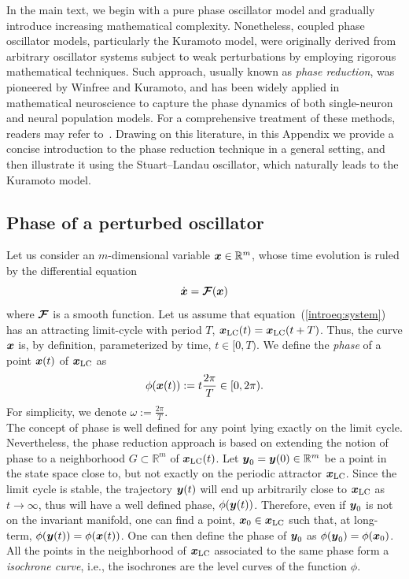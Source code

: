 In the main text, we begin with a pure phase oscillator model and gradually introduce increasing mathematical complexity.
Nonetheless, coupled phase oscillator models, particularly the Kuramoto model, were originally derived from arbitrary oscillator 
systems subject to weak perturbations by employing rigorous mathematical techniques.
Such approach, usually known as \emph{phase reduction}, was pioneered by Winfree and Kuramoto,
 and has been widely applied in mathematical neuroscience to capture the phase dynamics of both single-neuron and neural population models. For a comprehensive treatment of these methods, readers may refer to~\cite{Winfree2001,Kuramoto1984,hoppensteadt1997,Pikovsky2003}.
 Drawing on this literature, in this Appendix we provide a concise introduction to the phase reduction technique in a general setting, and then illustrate it using the Stuart–Landau oscillator, which naturally leads to the Kuramoto model.

\subsection{Phase of a perturbed oscillator}
\label{app:phase_of_perturbed_oscillator}
Let us consider an $m$-dimensional variable $\boldsymbol{x}\in\mathbb{R}^m$, whose time evolution is ruled by the differential equation
\begin{equation}\label{introeq:system}
\dot{\boldsymbol{x}}=\boldsymbol{\mathcal {F}}(\boldsymbol{x})
\end{equation}
where $\boldsymbol{\mathcal{F}}$ is a smooth function. Let us assume that equation~(\ref{introeq:system})
has an attracting limit-cycle with period $T$, $\boldsymbol{x}_{\text{LC}}(t)=\boldsymbol{x}_{\text{LC}}(t+T)$.
Thus, the curve $\boldsymbol{x}$ is, by definition, parameterized by time, $t\in[0,T)$.
We define the \emph{phase} of a point $\boldsymbol{x}(t)$ of $\boldsymbol{x}_{\text{LC}}$ as
\begin{equation}
\phi(\boldsymbol{x}(t)):=t\frac{2\pi}{T}\in[0,2\pi).
\end{equation}
For simplicity, we denote $\omega:=\frac{2\pi}{T}$.\\

The concept of phase is well defined for any point lying exactly on the limit cycle.
Nevertheless, the phase reduction approach is based on extending the notion of phase to a neighborhood $G\subset \mathbb{R}^m$ of $\boldsymbol{x}_{\text{LC}}(t)$.
Let $\boldsymbol{y}_0=\boldsymbol{y}(0)\in\mathbb{R}^m$ be a point in the state space close to, but not exactly on the periodic attractor $\boldsymbol{x}_{\text{LC}}$.
Since the limit cycle is stable, the trajectory $\boldsymbol{y}(t)$ will end up arbitrarily close to $\boldsymbol{x}_{\text{LC}}$ as $t\to\infty$,
thus will have a well defined phase, $\phi(\boldsymbol{y}(t))$.
Therefore, even if $\boldsymbol{y}_0$ is not on the invariant manifold,
one can find a point, $\boldsymbol{x}_0\in \boldsymbol{x}_{\text{LC}}$ such that, at long-term,
$\phi(\boldsymbol{y}(t))=\phi(\boldsymbol{x}(t))$.
One can then define the phase of $\boldsymbol{y}_0$ as $\phi(\boldsymbol{y}_0)=\phi(\boldsymbol{x}_0)$.
All the points in the neighborhood of $\boldsymbol{x}_{\text{LC}}$ associated to the same phase form a \emph{isochrone curve},
i.e., the isochrones are the level curves of the function $\phi$.
\\


